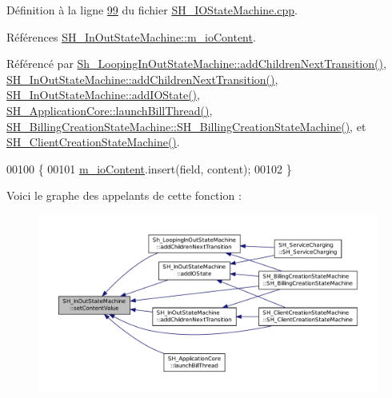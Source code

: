 Définition à la ligne \hyperlink{SH__IOStateMachine_8cpp_source_l00099}{99} du fichier \hyperlink{SH__IOStateMachine_8cpp_source}{S\-H\-\_\-\-I\-O\-State\-Machine.\-cpp}.



Références \hyperlink{classSH__InOutStateMachine_a661a1c7bd3b1086b3b5cd60ca957ecbd}{S\-H\-\_\-\-In\-Out\-State\-Machine\-::m\-\_\-io\-Content}.



Référencé par \hyperlink{classSh__LoopingInOutStateMachine_acfd8d0711c793b13c759f6c50be6a315}{Sh\-\_\-\-Looping\-In\-Out\-State\-Machine\-::add\-Children\-Next\-Transition()}, \hyperlink{classSH__InOutStateMachine_a689e5513ef6ef3fc1598efacd413372e}{S\-H\-\_\-\-In\-Out\-State\-Machine\-::add\-Children\-Next\-Transition()}, \hyperlink{classSH__InOutStateMachine_ad6b778d052f741daee720c047059ce0e}{S\-H\-\_\-\-In\-Out\-State\-Machine\-::add\-I\-O\-State()}, \hyperlink{classSH__ApplicationCore_a17a048025bc51a96663029e58c722741}{S\-H\-\_\-\-Application\-Core\-::launch\-Bill\-Thread()}, \hyperlink{classSH__BillingCreationStateMachine_ad62b77fa4aeafe200056ff3974562f83}{S\-H\-\_\-\-Billing\-Creation\-State\-Machine\-::\-S\-H\-\_\-\-Billing\-Creation\-State\-Machine()}, et \hyperlink{classSH__ClientCreationStateMachine_a0b406b0f404c0fd33bf35be8ce0cc811}{S\-H\-\_\-\-Client\-Creation\-State\-Machine()}.


\begin{DoxyCode}
00100 \{
00101     \hyperlink{classSH__InOutStateMachine_a661a1c7bd3b1086b3b5cd60ca957ecbd}{m\_ioContent}.insert(field, content);
00102 \}
\end{DoxyCode}


Voici le graphe des appelants de cette fonction \-:\nopagebreak
\begin{figure}[H]
\begin{center}
\leavevmode
\includegraphics[width=350pt]{classSH__InOutStateMachine_aa2766b7a7ba39c35a10df7fc0c151b4f_icgraph}
\end{center}
\end{figure}



